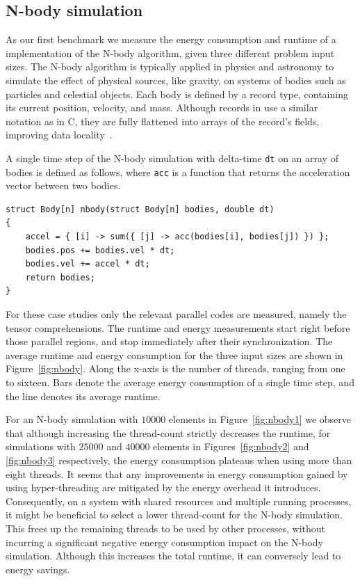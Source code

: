 \subsection{N-body simulation}

As our first benchmark we measure the energy consumption and runtime of a \sac{} implementation of
the N-body algorithm, given three different problem input sizes. The N-body algorithm is typically
applied in physics and astronomy to simulate the effect of physical sources, like gravity, on
systems of bodies such as particles and celestial objects. Each body is defined by a record type,
containing its current position, velocity, and mass. Although records in \sac{} use a similar
notation as in C, they are fully flattened into arrays of the record's fields, improving data
locality~\cite{sac-records}.

A single time step of the N-body simulation with delta-time \verb|dt| on an array of bodies is
defined as follows, where \verb|acc| is a function that returns the acceleration vector between two
bodies.
\begin{verbatim}
struct Body[n] nbody(struct Body[n] bodies, double dt)
{
    accel = { [i] -> sum({ [j] -> acc(bodies[i], bodies[j]) }) };
    bodies.pos += bodies.vel * dt;
    bodies.vel += accel * dt;
    return bodies;
}
\end{verbatim}

For these case studies only the relevant parallel codes are measured, namely the tensor
comprehensions. The runtime and energy measurements start right before those parallel regions, and
stop immediately after their synchronization. The average runtime and energy consumption for the
three input sizes are shown in Figure~\ref{fig:nbody}. Along the x-axis is the number of threads,
ranging from one to sixteen. Bars denote the average energy consumption of a single time step, and
the line denotes its average runtime.

For an N-body simulation with $10000$ elements in Figure~\ref{fig:nbody1} we observe that although
increasing the thread-count strictly decreases the runtime, for simulations with $25000$ and $40000$
elements in Figures~\ref{fig:nbody2} and \ref{fig:nbody3} respectively, the energy consumption
plateaus when using more than eight threads. It seems that any improvements in energy consumption
gained by using hyper-threading are mitigated by the energy overhead it introduces. Consequently, on
a system with shared resources and multiple running processes, it might be beneficial to select a
lower thread-count for the N-body simulation. This frees up the remaining threads to be used by
other processes, without incurring a significant negative energy consumption impact on the N-body
simulation. Although this increases the total runtime, it can conversely lead to energy savings.

